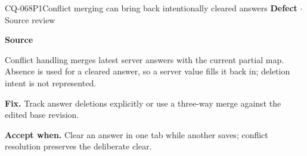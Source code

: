 \begin{finding}{CQ-068}{P1}{Conflict merging can bring back intentionally cleared answers}
\textbf{Defect} $\cdot$ Source review\par
\textbf{Source}\quad{}\par
Conflict handling merges latest server answers with the current partial map. Absence is used for a cleared answer, so a server value fills it back in; deletion intent is not represented.\par
\textbf{Fix.} Track answer deletions explicitly or use a three-way merge against the edited base revision.\par
\textbf{Accept when.} Clear an answer in one tab while another saves; conflict resolution preserves the deliberate clear.
\end{finding}
\clearpage
